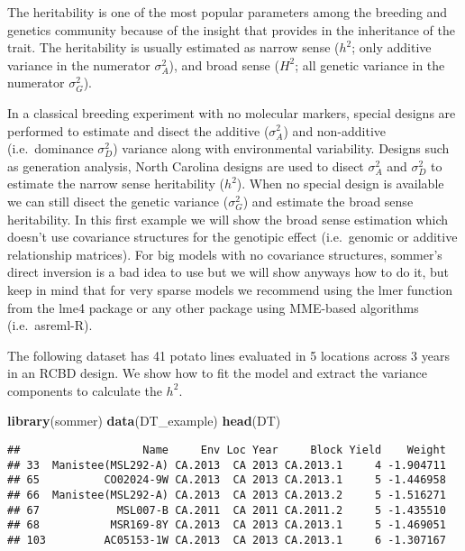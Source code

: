 \documentclass[]{article}
\newenvironment{Shaded}{\begin{snugshade}}{\end{snugshade}}
\newcommand{\KeywordTok}[1]{\textcolor[rgb]{0.13,0.29,0.53}{\textbf{#1}}}
\newcommand{\NormalTok}[1]{#1}
\begin{document}
The heritability is one of the most popular parameters among the
breeding and genetics community because of the insight that provides in
the inheritance of the trait. The heritability is usually estimated as
narrow sense (\(h^2\); only additive variance in the numerator
\(\sigma^2_A\)), and broad sense (\(H^2\); all genetic variance in the
numerator \(\sigma^2_G\)).

In a classical breeding experiment with no molecular markers, special
designs are performed to estimate and disect the additive
(\(\sigma^2_A\)) and non-additive (i.e.~dominance \(\sigma^2_D\))
variance along with environmental variability. Designs such as
generation analysis, North Carolina designs are used to disect
\(\sigma^2_A\) and \(\sigma^2_D\) to estimate the narrow sense
heritability (\(h^2\)). When no special design is available we can still
disect the genetic variance (\(\sigma^2_G\)) and estimate the broad
sense heritability. In this first example we will show the broad sense
estimation which doesn't use covariance structures for the genotipic
effect (i.e.~genomic or additive relationship matrices). For big models
with no covariance structures, sommer's direct inversion is a bad idea
to use but we will show anyways how to do it, but keep in mind that for
very sparse models we recommend using the lmer function from the lme4
package or any other package using MME-based algorithms (i.e.~asreml-R).

The following dataset has 41 potato lines evaluated in 5 locations
across 3 years in an RCBD design. We show how to fit the model and
extract the variance components to calculate the \(h^2\).

\begin{Shaded}
\begin{Highlighting}[]
\KeywordTok{library}\NormalTok{(sommer)}
\KeywordTok{data}\NormalTok{(DT_example)}
\KeywordTok{head}\NormalTok{(DT)}
\end{Highlighting}
\end{Shaded}

\begin{verbatim}
##                   Name     Env Loc Year     Block Yield    Weight
## 33  Manistee(MSL292-A) CA.2013  CA 2013 CA.2013.1     4 -1.904711
## 65          CO02024-9W CA.2013  CA 2013 CA.2013.1     5 -1.446958
## 66  Manistee(MSL292-A) CA.2013  CA 2013 CA.2013.2     5 -1.516271
## 67            MSL007-B CA.2011  CA 2011 CA.2011.2     5 -1.435510
## 68           MSR169-8Y CA.2013  CA 2013 CA.2013.1     5 -1.469051
## 103         AC05153-1W CA.2013  CA 2013 CA.2013.1     6 -1.307167
\end{verbatim}
\end{document}
